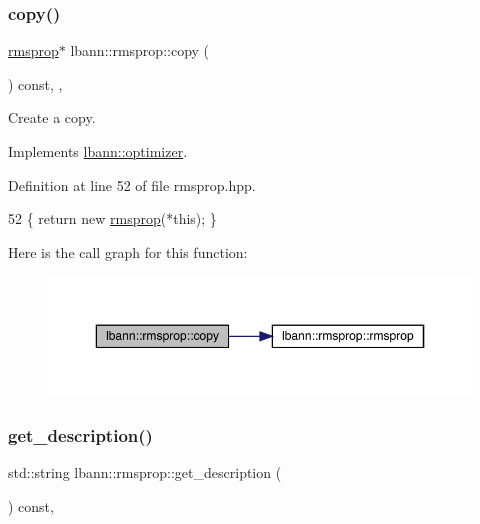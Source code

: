 \subsubsection{\texorpdfstring{copy()}{copy()}}
{\footnotesize\ttfamily \hyperlink{classlbann_1_1rmsprop}{rmsprop}$\ast$ lbann\+::rmsprop\+::copy (\begin{DoxyParamCaption}{ }\end{DoxyParamCaption}) const\hspace{0.3cm}{\ttfamily [inline]}, {\ttfamily [override]}, {\ttfamily [virtual]}}

Create a copy. 

Implements \hyperlink{classlbann_1_1optimizer_adf19a1d19d832ebfe70072cc202cdf39}{lbann\+::optimizer}.



Definition at line 52 of file rmsprop.\+hpp.


\begin{DoxyCode}
52 \{ \textcolor{keywordflow}{return} \textcolor{keyword}{new} \hyperlink{classlbann_1_1rmsprop_af42c8e3336e72aac926e19c57b56e59f}{rmsprop}(*\textcolor{keyword}{this}); \}
\end{DoxyCode}
Here is the call graph for this function\+:\nopagebreak
\begin{figure}[H]
\begin{center}
\leavevmode
\includegraphics[width=350pt]{classlbann_1_1rmsprop_a1493737d356809ad5c94f77051de8814_cgraph}
\end{center}
\end{figure}
\mbox{\label{classlbann_1_1rmsprop_a4526482bf60f7f3fc3f60ff70b38cdb7}} 
\subsubsection{\texorpdfstring{get\+\_\+description()}{get\_description()}}
{\footnotesize\ttfamily std\+::string lbann\+::rmsprop\+::get\+\_\+description (\begin{DoxyParamCaption}{ }\end{DoxyParamCaption}) const\hspace{0.3cm}{\ttfamily [override]}, {\ttfamily [virtual]}}

